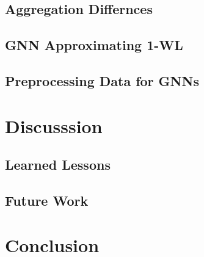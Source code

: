 \subsection{Aggregation Differnces}

\subsection{GNN Approximating 1-WL}

\subsection{Preprocessing Data for GNNs}

\section{Discusssion}\label{sec:discussion}
\subsection{Learned Lessons}
\subsection{Future Work}

\section{Conclusion}

\newpage


